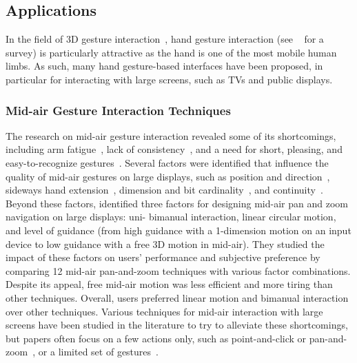 


\subsection{Applications} \label{sec:state_of_the_art:overview:applications}
In the field of 3D gesture interaction~\cite{LaViola:2013,Koutsabasis:2019}, hand gesture interaction (see ~\cite{Cheng:2016} for a survey) is particularly attractive as the hand is one of the most mobile human limbs. As such, many hand gesture-based interfaces have been proposed, in particular for interacting with large screens, such as TVs and public displays.

\subsubsection{Mid-air Gesture Interaction Techniques}
The research on mid-air gesture interaction revealed some of its shortcomings, including arm fatigue~\cite{Gupta:2017}, lack of consistency~\cite{Groenewald:2016}, and a need for short, pleasing, and easy-to-recognize gestures~\cite{Kohlsdorf:2013}. 
%
Several factors were identified that influence the quality of mid-air gestures on large displays, such as position and direction~\cite{Fruchard:2018}, sideways hand extension~\cite{Koutsabasis:2016}, dimension and bit cardinality~\cite{Vatavu:2013}, and continuity~\cite{Kohlsdorf:2013}. Beyond these factors, \cite{Nancel:2011} identified three factors for designing mid-air pan and zoom navigation on large displays: uni- \vs bimanual interaction, linear \vs circular motion, and level of guidance (from high guidance with a 1-dimension motion on an input device to low guidance with a free 3D motion in mid-air). They studied the impact of these factors on users' performance and subjective preference by comparing 12 mid-air pan-and-zoom techniques with various factor combinations. Despite its appeal, free mid-air motion was less efficient and more tiring than other techniques. Overall, users preferred linear motion and bimanual interaction over other techniques.
%
Various techniques for mid-air interaction with large screens have been studied in the literature to try to alleviate these shortcomings, but papers often focus on a few actions only, such as point-and-click or pan-and-zoom~\cite{Nacenta:2013}, or a limited set of gestures~\cite{Groenewald:2016}.

